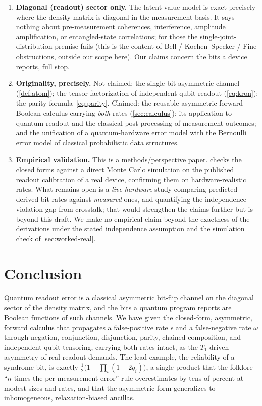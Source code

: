 \documentclass[12pt]{article}
\numberwithin{equation}{section}
\theoremstyle{plain}
\theoremstyle{definition}
\theoremstyle{remark}
\newcommand{\eps}{\epsilon}
\begin{document}
\begin{enumerate}[leftmargin=1.6em]
  \item \textbf{Diagonal (readout) sector only.} The latent-value model is exact
        precisely where the density matrix is diagonal in the measurement basis.
        It says nothing about pre-measurement coherences, interference, amplitude
        amplification, or entangled-state correlations; for those the
        single-joint-distribution premise fails (this is the content of Bell /
        Kochen--Specker / Fine obstructions, outside our scope here). Our claims
        concern the bits a device reports, full stop.

  \item \textbf{Originality, precisely.} Not claimed: the single-bit asymmetric
        channel (\cref{def:atom}); the tensor factorization of independent-qubit
        readout (\cref{eq:kron}); the parity formula~\eqref{eq:parity}. Claimed:
        the reusable asymmetric forward Boolean calculus carrying \emph{both}
        rates (\cref{sec:calculus}); its application to quantum readout and the
        classical post-processing of measurement outcomes; and the unification of
        a quantum-hardware error model with the Bernoulli error model of classical
        probabilistic data structures.

  \item \textbf{Empirical validation.} This is a methods/perspective paper.
         checks the closed forms against a direct Monte Carlo
        simulation on the published readout calibration of a real device,
        confirming them on hardware-realistic rates. What remains open is a
        \emph{live-hardware} study comparing predicted derived-bit rates against
        \emph{measured} ones, and quantifying the independence-violation gap from
        crosstalk; that would strengthen the claims further but is beyond this
        draft. We make no empirical claim beyond the exactness of the derivations
        under the stated independence assumption and the simulation check of
        \cref{sec:worked-real}.
\end{enumerate}


\section{Conclusion}
\label{sec:conclusion}

Quantum readout error is a classical asymmetric bit-flip channel on the diagonal
sector of the density matrix, and the bits a quantum program reports are Boolean
functions of such channels. We have given the closed-form, asymmetric, forward
calculus that propagates a false-positive rate $\eps$ and a false-negative rate
$\omega$ through negation, conjunction, disjunction, parity, chained composition,
and independent-qubit tensoring, carrying both rates intact, as the $T_1$-driven
asymmetry of real readout demands. The lead example, the reliability of a
syndrome bit, is exactly $\tfrac12\bigl(1-\prod_i(1-2q_i)\bigr)$, a single product
that the folklore ``$n$ times the per-measurement error'' rule overestimates by
tens of percent at modest sizes and rates, and that the asymmetric form
generalizes to inhomogeneous, relaxation-biased ancillas.
\end{document}
